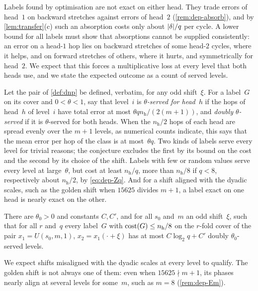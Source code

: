 Labels found by optimisation are not exact on either head. They trade errors of head~$1$ on backward stretches
against errors of head~$2$ (\cref{rem:dep-absorb}), and by \cref{lem:transfer}(c) such an absorption costs only about
$\lvert \delta \rvert/q$ per cycle. A lower bound for all labels must show that absorptions cannot be supplied consistently: an
error on a head-$1$ hop lies on backward stretches of some head-$2$ cycles, where it helps, and on forward stretches of
others, where it hurts, and symmetrically for head~$2$. We expect that this forces a multiplicative loss at every level
that both heads use, and we state the expected outcome as a count of served levels.

Let the pair of \cref{def:dnp} be defined, verbatim, for any odd shift~$\xi$. For a label~$G$ on its cover and
$0<\theta<1$, say that level~$i$ is \emph{$\theta$-served for head~$h$} if the hops of head~$h$ of level~$i$ have total error at most $\theta qn_{\mathrm h}/(2(m+1))$, and
\emph{doubly $\theta$-served} if it is $\theta$-served for both heads. When the $n_{\mathrm h}/2$ hops of each head are
spread evenly over the $m+1$ levels, as numerical counts indicate, this says that the mean error per hop of the class
is at most~$\theta q$. Two kinds of labels serve every level for trivial reasons; the conjecture excludes the first by
its bound on the cost and the second by its choice of the shift. Labels with few or random values serve every level at
large~$\theta$, but cost at least $n_{\mathrm h}/q$, more than $n_{\mathrm h}/8$ if $q<8$, respectively about
$n_{\mathrm h}/2$, by \eqref{eq:dep-Zq}. And for a shift aligned with the dyadic scales, such as the golden shift
when $15625$ divides $m+1$, a label exact on one head is nearly exact on the other.

\begin{conjecture}\label{conj:Aprime}
There are $\theta_0>0$ and constants $C,C'$, and for all $s_0$ and~$m$ an odd shift~$\xi$, such that for all $r$
and~$q$ every label~$G$ with $\mathrm{cost}(G)\le n_{\mathrm h}/8$ on the $r$-fold cover of the pair $x_1=U(s_0,m,1)$,
$x_2=x_1(\cdot+\xi)$ has at most $C\log_2q+C'$ doubly $\theta_0$-served levels.
\end{conjecture}

We expect shifts misaligned with the dyadic scales at every level to qualify. The golden shift is not always one of
them: even when $15625\nmid m+1$, its phases nearly align at several levels for some~$m$, such as $m=8$
(\cref{rem:dep-Em}).

